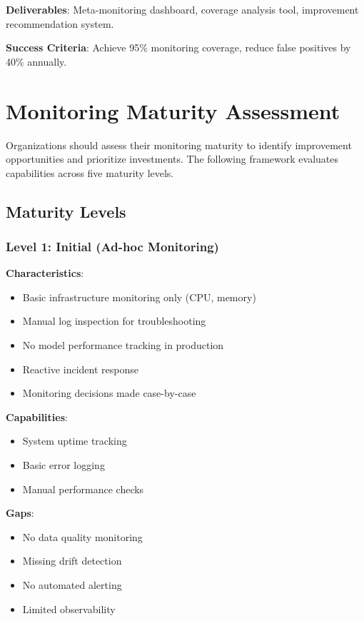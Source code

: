 \textbf{Deliverables}: Meta-monitoring dashboard, coverage analysis tool, improvement recommendation system.

\textbf{Success Criteria}: Achieve 95\% monitoring coverage, reduce false positives by 40\% annually.

\section{Monitoring Maturity Assessment}

Organizations should assess their monitoring maturity to identify improvement opportunities and prioritize investments. The following framework evaluates capabilities across five maturity levels.

\subsection{Maturity Levels}

\subsubsection{Level 1: Initial (Ad-hoc Monitoring)}

\textbf{Characteristics}:
\begin{itemize}
    \item Basic infrastructure monitoring only (CPU, memory)
    \item Manual log inspection for troubleshooting
    \item No model performance tracking in production
    \item Reactive incident response
    \item Monitoring decisions made case-by-case
\end{itemize}

\textbf{Capabilities}:
\begin{itemize}
    \item System uptime tracking
    \item Basic error logging
    \item Manual performance checks
\end{itemize}

\textbf{Gaps}:
\begin{itemize}
    \item No data quality monitoring
    \item Missing drift detection
    \item No automated alerting
    \item Limited observability
\end{itemize}

